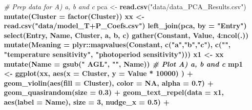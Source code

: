 \documentclass[
]{article}
\newenvironment{Shaded}{\begin{snugshade}}{\end{snugshade}}
\newcommand{\CommentTok}[1]{\textcolor[rgb]{0.56,0.35,0.01}{\textit{#1}}}
\newcommand{\DataTypeTok}[1]{\textcolor[rgb]{0.13,0.29,0.53}{#1}}
\newcommand{\DecValTok}[1]{\textcolor[rgb]{0.00,0.00,0.81}{#1}}
\newcommand{\FloatTok}[1]{\textcolor[rgb]{0.00,0.00,0.81}{#1}}
\newcommand{\KeywordTok}[1]{\textcolor[rgb]{0.13,0.29,0.53}{\textbf{#1}}}
\newcommand{\NormalTok}[1]{#1}
\newcommand{\OperatorTok}[1]{\textcolor[rgb]{0.81,0.36,0.00}{\textbf{#1}}}
\newcommand{\OtherTok}[1]{\textcolor[rgb]{0.56,0.35,0.01}{#1}}
\newcommand{\StringTok}[1]{\textcolor[rgb]{0.31,0.60,0.02}{#1}}
\begin{document}
\begin{Shaded}
\begin{Highlighting}[]
\CommentTok{# Prep data for A) a, b and c}
\NormalTok{pca <-}\StringTok{ }\KeywordTok{read.csv}\NormalTok{(}\StringTok{"data/data_PCA_Results.csv"}\NormalTok{) }\OperatorTok{%
\StringTok{  }\KeywordTok{mutate}\NormalTok{(}\DataTypeTok{Cluster =} \KeywordTok{factor}\NormalTok{(Cluster))}
\NormalTok{xx <-}\StringTok{ }\KeywordTok{read.csv}\NormalTok{(}\StringTok{"data/model_T+P_Coefs.csv"}\NormalTok{) }\OperatorTok{%
\StringTok{  }\KeywordTok{left_join}\NormalTok{(pca, }\DataTypeTok{by =} \StringTok{"Entry"}\NormalTok{) }\OperatorTok{%
\StringTok{  }\KeywordTok{select}\NormalTok{(Entry, Name, Cluster, a, b, c) }\OperatorTok{%
\StringTok{  }\KeywordTok{gather}\NormalTok{(Constant, Value, }\DecValTok{4}\OperatorTok{:}\KeywordTok{ncol}\NormalTok{(.)) }\OperatorTok{%
\StringTok{  }\KeywordTok{mutate}\NormalTok{(}\DataTypeTok{Meaning =}\NormalTok{ plyr}\OperatorTok{::}\KeywordTok{mapvalues}\NormalTok{(Constant, }\KeywordTok{c}\NormalTok{(}\StringTok{"a"}\NormalTok{,}\StringTok{"b"}\NormalTok{,}\StringTok{"c"}\NormalTok{),}
           \KeywordTok{c}\NormalTok{(}\StringTok{""}\NormalTok{, }\StringTok{"temperature sensitivity"}\NormalTok{, }\StringTok{"photoperiod sensitivity"}\NormalTok{)))}
\NormalTok{x1 <-}\StringTok{ }\NormalTok{xx }\OperatorTok{%
\StringTok{  }\KeywordTok{mutate}\NormalTok{(}\DataTypeTok{Name =} \KeywordTok{gsub}\NormalTok{(}\StringTok{" AGL"}\NormalTok{, }\StringTok{""}\NormalTok{, Name))}
\CommentTok{# Plot A) a, b and c}
\NormalTok{mp1 <-}\StringTok{ }\KeywordTok{ggplot}\NormalTok{(xx, }\KeywordTok{aes}\NormalTok{(}\DataTypeTok{x =}\NormalTok{ Cluster, }\DataTypeTok{y =}\NormalTok{ Value }\OperatorTok{*}\StringTok{ }\DecValTok{10000}\NormalTok{) ) }\OperatorTok{+}\StringTok{ }
\StringTok{  }\KeywordTok{geom_violin}\NormalTok{(}\KeywordTok{aes}\NormalTok{(}\DataTypeTok{fill =}\NormalTok{ Cluster), }\DataTypeTok{color =} \OtherTok{NA}\NormalTok{, }\DataTypeTok{alpha =} \FloatTok{0.7}\NormalTok{) }\OperatorTok{+}\StringTok{ }
\StringTok{  }\KeywordTok{geom_quasirandom}\NormalTok{(}\DataTypeTok{size =} \FloatTok{0.3}\NormalTok{) }\OperatorTok{+}\StringTok{ }
\StringTok{  }\KeywordTok{geom_text_repel}\NormalTok{(}\DataTypeTok{data =}\NormalTok{ x1, }\KeywordTok{aes}\NormalTok{(}\DataTypeTok{label =}\NormalTok{ Name), }\DataTypeTok{size =} \DecValTok{3}\NormalTok{, }\DataTypeTok{nudge_x =} \FloatTok{0.5}\NormalTok{) }\OperatorTok{+}
}}}}}}
\end{Highlighting}
\end{Shaded}
\end{document}
